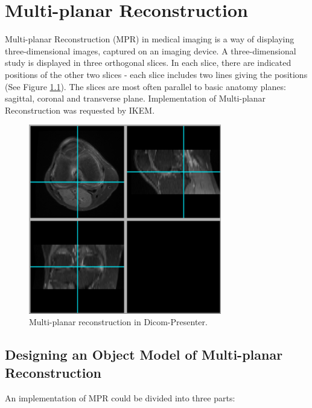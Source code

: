 \chapter{Multi-planar Reconstruction}
\vspace{-10mm}
\label{multiplanar}



Multi-planar Reconstruction (MPR) in medical imaging is a way of displaying three-dimensional images, captured on an imaging device. A three-dimensional study is displayed in three orthogonal slices. In each slice, there are indicated positions of the other two slices - each slice includes two lines giving the positions (See Figure \ref{fig:multiplanar}). The slices are most often parallel to basic anatomy planes\cite{ctteachingmanual}: sagittal, coronal and transverse plane.  Implementation of Multi-planar Reconstruction was requested by IKEM.

\begin{figure}
 	\caption{Multi-planar reconstruction in Dicom-Presenter.\label{fig:multiplanar}}
	\begin{center}
	\includegraphics[width=0.75\textwidth]{Text/IMG/MultiPlanar.png}
	\end{center}
\end{figure}

\section{Designing an Object Model of Multi-planar Reconstruction}

An implementation of MPR could be divided into three parts:

